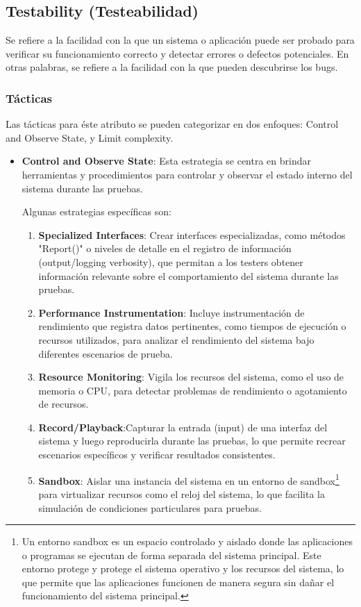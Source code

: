\documentclass{article}
\begin{document}
		
		\subsection{Testability \small{(Testeabilidad)}}
		Se refiere a la facilidad con la que un sistema o aplicación puede ser probado para verificar su funcionamiento correcto y detectar errores o defectos potenciales. En otras palabras, se refiere a la facilidad con la que pueden descubrirse los bugs.
		\subsubsection{Tácticas}
		Las tácticas para éste atributo se pueden categorizar en dos enfoques: Control and Observe State, y Limit complexity. 
		
		
		\begin{itemize}		
			\item \textbf{Control and Observe State}:
			Esta estrategia se centra en brindar herramientas y procedimientos para controlar y observar el estado interno del sistema durante las pruebas. 
			
			Algunas estrategias específicas son:
			\begin{enumerate}
				\item \textbf{Specialized Interfaces}: Crear interfaces especializadas, como métodos "Report()" o niveles de detalle en el registro de información (output/logging verbosity), que permitan a los testers obtener información relevante sobre el comportamiento del sistema durante las pruebas.

				\item \textbf{Performance Instrumentation}: Incluye instrumentación de rendimiento que registra datos pertinentes, como tiempos de ejecución o recursos utilizados, para analizar el rendimiento del sistema bajo diferentes escenarios de prueba.
				
				
				\item \textbf{Resource Monitoring}: Vigila los recursos del sistema, como el uso de memoria o CPU, para detectar problemas de rendimiento o agotamiento de recursos.
				
				\item \textbf{Record/Playback}:Capturar la entrada (input) de una interfaz del sistema y luego reproducirla durante las pruebas, lo que permite recrear escenarios específicos y verificar resultados consistentes.
				
				\item \textbf{Sandbox}: Aislar una instancia del sistema en un entorno de sandbox\footnote{Un entorno sandbox es un espacio controlado y aislado donde las aplicaciones o programas se ejecutan de forma separada del sistema principal. Este entorno protege y protege el sistema operativo y los recursos del sistema, lo que permite que las aplicaciones funcionen de manera segura sin dañar el funcionamiento del sistema principal.} para virtualizar recursos como el reloj del sistema, lo que facilita la simulación de condiciones particulares para pruebas.
				

\end{enumerate}
\end{itemize}
\end{document}
